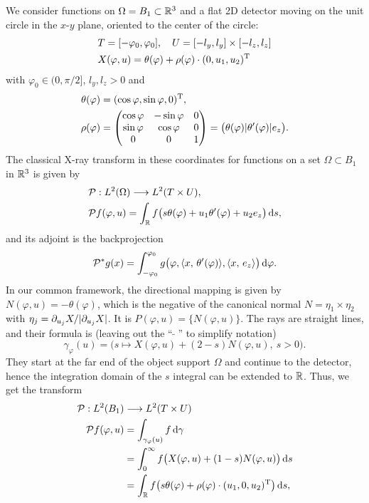 \documentclass{amsart}
\renewcommand*{\phi}{\varphi}
\begin{document}
We consider functions on $\Omega= B_1 \subset {\ensuremath{\mathbb{R}}}^3$ and a flat 2D detector moving on the unit circle in the $x$-$y$ 
plane, oriented to the center of the circle:
%
\begin{align*}
 & T = [-\phi_0, \phi_0],\quad U = [-l_y, l_y] \times [-l_z, l_z] \\
 & X(\phi, u) = \theta(\phi) + \rho(\phi) \cdot \TRANSP{(0, u_1, u_2)}
\end{align*}
%
with $\phi_0 \in (0, \pi/2]$, $l_y, l_z > 0$ and
%
\begin{align}
 \theta(\phi) &= \TRANSP{(\cos\phi, \sin\phi, 0)}, \\ 
 \rho(\phi) &=
 \begin{pmatrix}
  \cos\phi & -\sin\phi & 0 \\
  \sin\phi & \cos\phi & 0 \\
  0 & 0 & 1
 \end{pmatrix}
 = \big(\theta(\phi) | \theta'(\phi) | e_z\big).
\end{align}
%
The classical X-ray transform in these coordinates for functions on a set $\Omega \subset B_1$ in ${\mathbb{R}}^3$ is given by
%
\begin{align}
 &\OPP: L^2(\Omega) \Lto L^2(T \times U), \notag \\
 \label{eq:parflat:fwdproj}
 &\OPP f(\phi, u) = \int_\RR f\big(s\theta(\phi) + u_1 \theta'(\phi) + u_2 e_z\big)\, \D s,
\end{align}
%
and its adjoint is the backprojection
%
\begin{equation}
 \label{eq:parflat:backproj}
 \DUALOPP g(x) = \int_{-\phi_0}^{\phi_0} g\big(\phi, \INNER{x}{\theta'(\phi)}, \INNER{x}{e_z}\big)\, \D \phi.
\end{equation}
%
In our common framework, the directional mapping is given by $N(\phi, u) = -\theta(\phi)$, which is the negative of the canonical normal 
$N = \eta_1 \times \eta_2$ with $\eta_j = \partial_{u_j} X / |\partial_{u_j} X|$. It is $P(\phi, u) = \lbrace N(\phi, u)\rbrace$.
The rays are straight lines, and their formula is (leaving out the ``$\,\widetilde{\ }\,$'' to simplify notation)
%
\begin{equation*}
 \gamma_\phi(u) = \big( s \mapsto X(\phi, u) + (2-s) N(\phi, u),\ s > 0 \big).
\end{equation*}
%
They start at the far end of the object support $\Omega$ and continue to the detector, hence the integration domain of the $s$ 
integral can be extended to ${\mathbb{R}}$. Thus, we get the transform
%
\begin{align*}
 \OPP: L^2(B_1) & \Lto L^2(T \times U) \\
 \OPP f(\phi, u) 
 &= \int_{\gamma_\phi(u)} f\, \D \gamma \\
 &= \int_0^\infty f\big(X(\phi, u) + (1-s) N(\phi, u)\big)\, \D s \\
 &= \int_\RR f\big(s \theta(\phi) + \rho(\phi) \cdot \TRANSP{(u_1, 0, u_2)}\big)\, \D s,
\end{align*}
\end{document}
